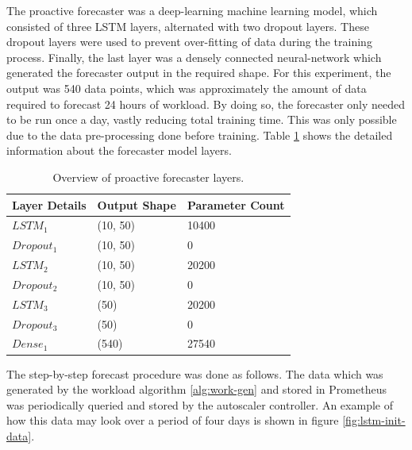 The proactive forecaster was a deep-learning machine learning model, which consisted of three LSTM layers, alternated with two dropout layers. These dropout layers were used to prevent over-fitting of data during the training process. Finally, the last layer was a densely connected neural-network which generated the forecaster output in the required shape. For this experiment, the output was 540 data points, which was approximately the amount of data required to forecast 24 hours of workload. By doing so, the forecaster only needed to be run once a day, vastly reducing total training time. This was only possible due to the data pre-processing done before training. Table \ref{tab:lstm-layers} shows the detailed information about the forecaster model layers.\par

\begin{table}
    \caption{Overview of proactive forecaster layers.}\label{tab:lstm-layers}
    \centering
    \begin{tabular}{|l|l|l|}
        \hline
        Layer Details & Output Shape & Parameter Count\\
        \hline
        $LSTM_{1}$ & (10, 50) & 10400\\
        $Dropout_{1}$ & (10, 50) & 0\\
        $LSTM_{2}$ & (10, 50) & 20200\\
        $Dropout_{2}$ & (10, 50) & 0\\
        $LSTM_{3}$ & (50) & 20200\\
        $Dropout_{3}$ & (50) & 0\\
        $Dense_{1}$ & (540) & 27540\\
        \hline
    \end{tabular}
\end{table}

The step-by-step forecast procedure was done as follows. The data which was generated by the workload algorithm \ref{alg:work-gen} and stored in Prometheus was periodically queried and stored by the autoscaler controller. An example of how this data may look over a period of four days is shown in figure \ref{fig:lstm-init-data}.

